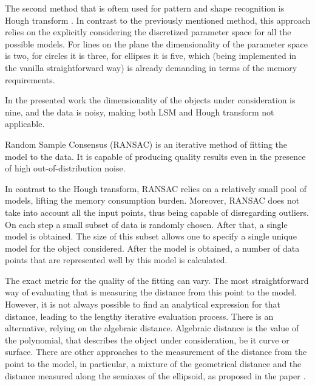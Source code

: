 The second method that is oftem used for pattern and shape recognition is Hough transform \cite{hough1962method}.
In contrast to the previously mentioned method, this approach relies on the explicitly considering the discretized parameter space for all the possible models.
For lines on the plane the dimensionality of the parameter space is two, for circles it is three, for ellipses it is five, which (being implemented in the vanilla straightforward way) is already demanding in terms of the memory requirements.

In the presented work the dimensionality of the objects under consideration is nine, and the data is noisy, making both LSM and Hough transform not applicable.

Random Sample Consensus (RANSAC) is an iterative method of fitting the model to the data.
It is capable of producing quality results even in the presence of high out-of-distribution noise.

In contrast to the Hough transform, RANSAC relies on a relatively small pool of models, lifting the memory consumption burden.
Moreover, RANSAC does not take into account all the input points, thus being capable of disregarding outliers.
On each step a small subset of data is randomly chosen.
After that, a single model is obtained.
The size of this subset allows one to specify a single unique model for the object considered.
After the model is obtained, a number of data points that are represented well by this model is calculated.

The exact metric for the quality of the fitting can vary.
The most straightforward way of evaluating that is measuring the distance from this point to the model.
However, it is not always possible to find an analytical expression for that distance, leading to the lengthy iterative evaluation process.
There is an alternative, relying on the algebraic distance.
Algebraic distance is the value of the polynomial, that describes the object under consideration, be it curve or surface.
There are other approaches to the measurement of the distance from the point to the model, in particular, a mixture of the geometrical distance and the distance measured along the semiaxes of the ellipsoid, as proposed in the paper \cite{han2023}.


